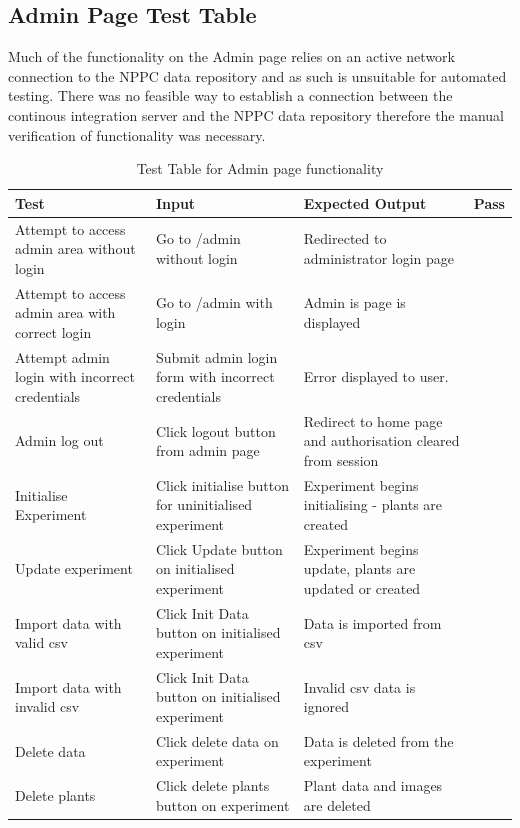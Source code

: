 \subsection{Admin Page Test Table}
Much of the functionality on the Admin page relies on an active network connection to the NPPC data repository and as such is unsuitable for automated testing. There was no feasible way to establish a connection between the continous integration server and the NPPC data repository therefore the manual verification of functionality was necessary.
\begin{table}[H]
\centering
\begin{tabular}{ | p{4cm} | p{4cm} |p{4cm} | p{1cm} | }
\hline
	\textbf{Test} & \textbf{Input} & \textbf{Expected Output} & \textbf{Pass} \\ \hline
	Attempt to access admin area without login & Go to /admin without login & Redirected to administrator login page & \checkmark \\ \hline
	Attempt to access admin area with correct login & Go to /admin with login & Admin is page is displayed & \checkmark \\ \hline
	Attempt admin login with incorrect credentials & Submit admin login form with incorrect credentials & Error displayed to user. & \checkmark \\ \hline
	Admin log out & Click logout button from admin page & Redirect to home page and authorisation cleared from session & \checkmark \\ \hline
	Initialise Experiment & Click initialise button for uninitialised experiment & Experiment begins initialising - plants are created & \checkmark \\ \hline
	Update experiment & Click Update button on initialised experiment & Experiment begins update, plants are updated or created & \checkmark \\ \hline
	Import data with valid csv & Click Init Data button on initialised experiment & Data is imported from csv & \checkmark \\ \hline
	Import data with invalid csv & Click Init Data button on initialised experiment & Invalid csv data is ignored & \checkmark \\ \hline
	Delete data & Click delete data on experiment & Data is deleted from the experiment & \checkmark \\ \hline
	Delete plants & Click delete plants button on experiment & Plant data and images are deleted & \checkmark \\ \hline
\end{tabular}
\caption{Test Table for Admin page functionality}
\label{test_table_admin}
\end{table}
